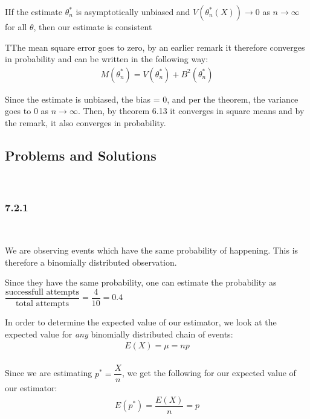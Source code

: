 \par\bigskip
\begin{theo}
  IIf the estimate $\theta_n^*$ is asymptotically unbiased and $V(\theta_n^*(X))\to0$ as $n\to\infty$ for all $\theta$, then our estimate is consistent
\end{theo}
\par\bigskip
\begin{prf}
  TThe mean square error goes to zero, by an earlier remark it therefore converges in probability and can be written in the following way:
  \begin{equation*}
    \begin{gathered}
      M(\theta_n^*) = V(\theta_n^*)+B^2(\theta_n^*)
    \end{gathered}
  \end{equation*}\par
 \noindent Since the estimate is unbiased, the bias = 0, and per the theorem, the variance goes to 0 as $n\to\infty$. Then, by theorem 6.13 it converges in square means and by the remark, it also converges in probability. 
\end{prf}
\par\bigskip
\subsection{Problems and Solutions}\hfill\\\par
\subsubsection{7.2.1}\hfill\\\par
\noindent We are observing events which have the same probability of happening. This is therefore a binomially distributed observation.
\par\bigskip
\noindent Since they have the same probability, one can estimate the probability as $\dfrac{\text{successfull attempts}}{\text{total attempts}} = \dfrac{4}{10} = 0.4$
\par\bigskip
\noindent In order to determine the expected value of our estimator, we look at the expected value for \textit{any} binomially distributed chain of events:
\begin{equation*}
  \begin{gathered}
    E(X) = \mu = np\\
  \end{gathered}
\end{equation*}
\par\bigskip
\noindent Since we are estimating $p^* = \dfrac{X}{n}$, we get the following for our expected value of our estimator:
\begin{equation*}
  \begin{gathered}
    E(p^*) = \dfrac{E(X)}{n} = p
  \end{gathered}
\end{equation*}
